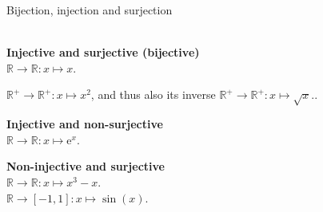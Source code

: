 \documentclass[aspectratio=169]{beamer}
\begin{document}
\begin{frame}[t]{Bijection, injection and surjection}
\framesubtitle{}
\vspace{-0.5cm}
\begin{columns}[T,onlytextwidth]
    \begin{column}{0.49\textwidth}
        \textbf{Injective and surjective (bijective)}\\
$\mathbb {R} \to \mathbb {R} :x\mapsto x.$

$\mathbb {R} ^{+}\to \mathbb {R} ^{+}:x\mapsto x^{2}$, and thus also its inverse $\mathbb {R} ^{+}\to \mathbb {R} ^{+}:x\mapsto {\sqrt {x}}.$.

\textbf{Injective and non-surjective}\\
$\mathbb {R} \to \mathbb {R} :x\mapsto \mathrm {e} ^{x}$.

\textbf{Non-injective and surjective}\\
$\mathbb {R} \to \mathbb {R} :x\mapsto x^{3}-x.$\\
$\mathbb {R} \to [-1,1]:x\mapsto \sin(x).$


\end{column}
\end{columns}
\end{frame}
\end{document}
